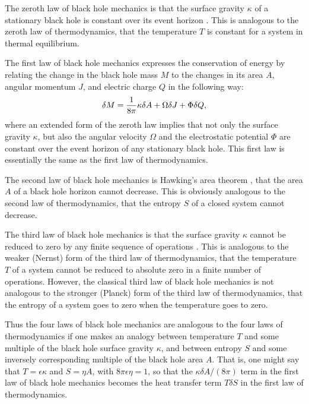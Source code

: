 \documentclass[12pt]{article} \usepackage{latexsym} \textwidth 15cm
\begin{document}
The zeroth law of black hole mechanics is that the surface gravity
$\kappa$ of a stationary black hole is constant over its event horizon
\cite{Carter,BCH}.  This is analogous to the zeroth law of
thermodynamics, that the temperature $T$ is constant for a system in
thermal equilibrium.

The first law of black hole mechanics expresses the conservation of
energy by relating the change in the black hole mass $M$ to the
changes in its area $A$, angular momentum $J$, and electric charge $Q$
in the following way:
 \begin{equation}
 \delta M = {1\over 8\pi} \kappa \delta A + \Omega \delta J
    + \Phi \delta Q,
 \label{eq:1}
 \end{equation}
where an extended form of the zeroth law implies that not only the
surface gravity $\kappa$, but also the angular velocity $\Omega$ and
the electrostatic potential $\Phi$ are constant over the event horizon
of any stationary black hole.  This first law is essentially the same
as the first law of thermodynamics.

The second law of black hole mechanics is Hawking's area theorem
\cite{Hawkingarea}, that the area $A$ of a black hole horizon cannot
decrease.  This is obviously analogous to the second law of
thermodynamics, that the entropy $S$ of a closed system cannot
decrease.

The third law of black hole mechanics is that the surface gravity
$\kappa$ cannot be reduced to zero by any finite sequence of
operations \cite{Israel}.  This is analogous to the weaker (Nernst)
form of the third law of thermodynamics, that the temperature $T$ of a
system cannot be reduced to absolute zero in a finite number of
operations.  However, the classical third law of black hole mechanics
is not analogous to the stronger (Planck) form of the third law of
thermodynamics, that the entropy of a system goes to zero when the
temperature goes to zero.

Thus the four laws of black hole mechanics are analogous to the four
laws of thermodynamics if one makes an analogy between temperature $T$
and some multiple of the black hole surface gravity $\kappa$, and
between entropy $S$ and some inversely corresponding multiple of the
black hole area $A$.  That is, one might say that $T = \epsilon
\kappa$ and $S = \eta A$, with $8\pi\epsilon\eta = 1$, so that the
$\kappa \delta A/(8\pi)$ term in the first law of black hole mechanics
becomes the heat transfer term $T\delta S$ in the first law of
thermodynamics.
\end{document}
